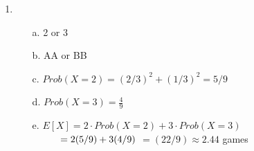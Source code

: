 {\begin{enumerate}
        \item
            \begin{itemize}
                \item[a.]   2 or 3
                \item[b.]   AA or BB
                \item[c.]   $Prob(X = 2) = (2/3)^2 + (1/3)^2 = 5/9$
                \item[d.]   $Prob(X=3) = \frac{4}{9}$
                \item[e.]   $E[X] = 2 \cdot Prob(X=2) + 3 \cdot Prob(X=3) $ \\
                            $ \hspace*{1cm} = 2 (5/9) + 3 (4/9) $ \tab
                            $ = (22/9) \approx 2.44$ games
            \end{itemize}
    \end{enumerate}

}


